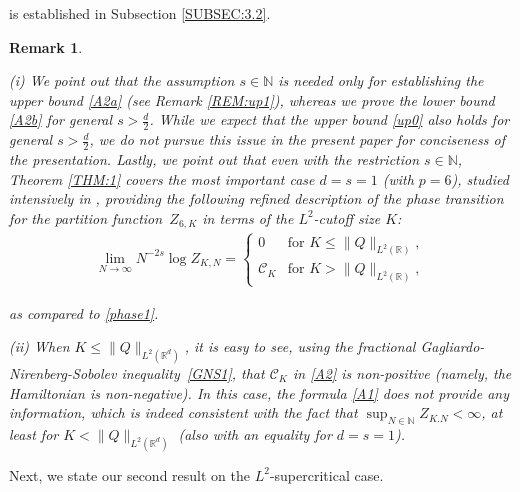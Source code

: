 \documentclass[letterpaper, 11pt,  reqno]{amsart}
\newtheorem{remark}[theorem]{Remark}
\newcommand{\noi}{\noindent}
\newcommand{\R}{\mathbb{R}}
\newcommand{\N}{\mathbb{N}}
\numberwithin{equation}{section}
\numberwithin{theorem}{section}
\newcommand{\CC}{\mathcal{C}}
\begin{document}
\noi
is established 
in Subsection \ref{SUBSEC:3.2}. 

\begin{remark}\label{REM:1}\rm

(i) 
We point out that the assumption  $s \in \N$
is needed only for establishing the upper bound \eqref{A2a}
(see Remark \ref{REM:up1}), 
whereas we prove the lower bound \eqref{A2b}
for general $s > \frac d2$.
While we expect that the upper bound \eqref{up0}
also holds for general $s > \frac d2$, 
we do not pursue this issue
in the present paper
for conciseness of the presentation.
Lastly, we point out that 
even with the restriction $s \in \N$, 
Theorem \ref{THM:1} covers
the most important case $d = s = 1$
(with $p = 6$), 
studied intensively in \cite{LRS, BO94, OST1}, 
providing the following refined description
of  the  phase transition for the partition
function~$Z_{6, K}$ in terms of the $L^2$-cutoff size $K$:
\begin{align*}
\lim_{N \to \infty} N^{-2s}\log Z_{K,N}
= 
\begin{cases}
0 & \text{for } K \leq \|Q\|_{L^2(\R)}, \\
\CC_K & \text{for } K > \|Q\|_{L^2(\R)}, 
\end{cases}
\end{align*}


\noi
as compared to 
 \eqref{phase1}.


\medskip


\noi
(ii)  When    $K \le  \|Q\|_{L^2 (\R^d)}$, 
it is easy to see, 
using the  
fractional Gagliardo-Nirenberg-Sobolev inequality~\eqref{GNS1}, 
 that  
$\CC_K$ in \eqref{A2} is non-positive
(namely, the Hamiltonian is non-negative).
In this case, 
 the formula \eqref{A1}
does not provide any information,
which is indeed consistent with 
the fact that $\sup_{N \in \N} Z_{K. N}  < \infty$, 
at least for    $K <  \|Q\|_{L^2 (\R^d)}$
(also with an equality
for $d = s = 1$).



\end{remark}








Next, we state our second result on  the $L^2$-supercritical case.
\end{document}
